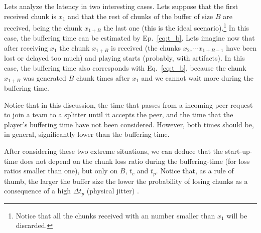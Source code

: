 Lets analyze the latency in two interesting cases. Lets suppose that
the first received chunk is $x_1$ and that the rest of chunks of the
buffer of size $B$ are received, being the chunk $x_{1+B}$ the last
one (this is the ideal scenario).\footnote{Notice that all the chunks
  received with an number smaller than $x_1$ will be discarded.} In
this case, the buffering time can be estimated by
Ep.~\ref{eq:t_b}. Lets imagine now that after receiving $x_1$ the
chunk $x_{1+B}$ is received (the chunks $x_2, \cdots x_{1+B-1}$ have
been lost or delayed too much) and playing starts (probably, with
artifacts). In this case, the buffering time also corresponds with
Eq.~\ref{eq:t_b}, because the chunk $x_{1+B}$ was generated $B$ chunk
times after $x_1$ and we cannot wait more during the buffering time.

Notice that in this discussion, the time that passes from a incoming
peer request to join a team to a splitter until it accepts the peer,
and the time that the player's buffering time have not been
considered. However, both times should be, in general, significantly
lower than the buffering time.

After considering these two extreme situations, we can deduce that the
start-up-time does not depend on the chunk loss ratio during the
buffering-time (for loss ratios smaller than one), but only on $B$,
$t_c$ and $t_p$. Notice that, as a rule of thumb, the larger the
buffer size the lower the probability of losing chunks as a
consequence of a high $\Delta t_p$ (physical jitter) .
